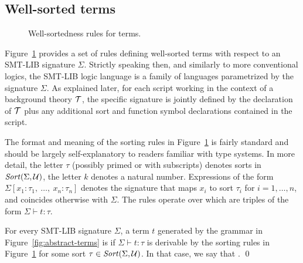 \subsection{Well-sorted terms}
 
\begin{figure}
 \termrules
\caption{Well-sortedness rules for terms.}
\label{fig:well-sorted-terms}
\end{figure}

Figure~\ref{fig:well-sorted-terms} provides a set of rules defining 
well-sorted terms with respect to an SMT-LIB signature $\Sigma$.
Strictly speaking then, and similarly to more conventional logics,
the SMT-LIB logic language is a family of languages parametrized 
by the signature $\Sigma$.
As explained later, 
for each script working in the context of a background theory $\mathcal{T}$,
the specific signature is jointly defined by the declaration of $\mathcal{T}$ plus
any additional sort and function symbol declarations contained in the script.

The format and meaning of the sorting rules in Figure~\ref{fig:well-sorted-terms} 
is fairly standard and should be largely self-explanatory 
to readers familiar with type systems.
In more detail, the letter $\tau$ (possibly primed or with subscripts) 
denotes sorts in $\mathit{Sort}(\Sigma, \mathcal{U})$,
the letter $k$ denotes a natural number.
%
Expressions of the form $\Sigma[x_1:\tau_1,\: \ldots,\: x_n:\tau_n]$ 
denotes the signature 
that maps $x_i$ to sort $\tau_i$ for $i=1,\ldots,n$, and 
coincides otherwise with $\Sigma$.
The rules operate over 
which are triples of the form $\Sigma \vdash t : \tau$.

\begin{definition}
For every SMT-LIB signature $\Sigma$,
a term $t$ generated by the grammar in Figure~\ref{fig:abstract-terms}
is 
if $\Sigma \vdash t : \tau$ is derivable 
by the sorting rules in Figure~\ref{fig:well-sorted-terms}
for some sort $\tau \in \mathit{Sort}(\Sigma,\mathcal{U})$.
In that case, 
we say that .
\qed
\end{definition}

